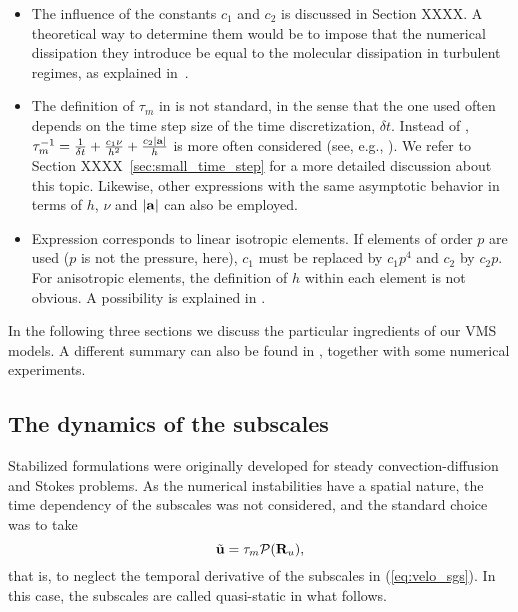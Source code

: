 \begin{itemize}
\item The influence of the constants $c_1$ and $c_2$ is discussed in Section XXXX. A theoretical way to determine them would be to impose that the numerical dissipation they introduce be equal to the molecular dissipation in turbulent regimes, as explained in~\cite{guasch-codina-13}. 
\item The definition of $\tau_m$ in  is not standard, in the sense that the one used often depends on the time step size of the time discretization, $\delta t$. Instead of , $\tau_m^{-1}=\frac{1}{\delta t} + \frac{c_1\nu}{h^2}+\frac{c_2|{\bf a}|}{h}$ is more often considered (see, e.g., \cite{Hsu2010,gamnitzer_time-dependent_2010}). We refer to 
Section XXXX~\ref{sec:small_time_step} for a more detailed discussion about this topic. Likewise, other expressions with the same asymptotic behavior in terms of $h$, $\nu$ and $|{\bf a}|$ can also be employed.
\item Expression  corresponds to linear isotropic elements. If elements of order $p$ are used ($p$ is not the pressure, here), $c_1$ must be replaced by $c_1 p^4$ and $c_2$ by $c_2 p$. For anisotropic elements, the definition of $h$ within each element is not obvious. A possibility is explained in \cite{Principe2010}.
\end{itemize}

In the following three sections we discuss the particular ingredients of our VMS models. A different summary can also be found in \cite{Codina-chap-2011}, together with some numerical experiments. 

\subsection{The dynamics of the subscales}
\label{subsec-C2_dyn}
Stabilized formulations were originally developed for steady convection-diffusion \cite{Brooks_1982} and Stokes \cite{Douglas_1989,Hughes_1986_5} problems. As the numerical instabilities have a spatial nature, the time dependency of the subscales was not considered, and the standard choice \cite{Hughes2000,hughes_large_2001,bazilevs_variational_2007} was to take 
\begin{equation}
\label{eq-C2_static_sgs}
\tilde{{\bf u}}=\tau_m \mathcal{P}({\bf R}_u),
\end{equation}
that is, to neglect the temporal derivative of the subscales in (\ref{eq:velo_sgs}). In this case, the subscales are called quasi-static in what follows.

